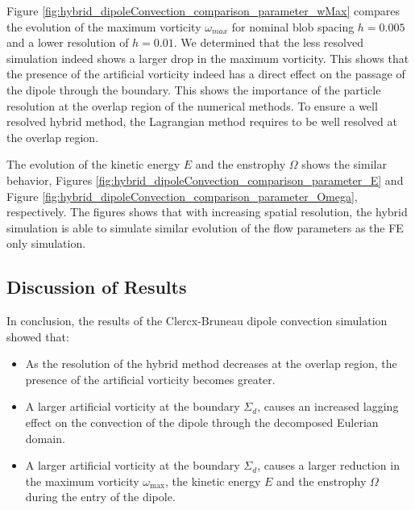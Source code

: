 
Figure \ref{fig:hybrid_dipoleConvection_comparison_parameter_wMax} compares the evolution of the maximum vorticity $\omega_{max}$ for nominal blob spacing $h=0.005$ and a lower resolution of $h=0.01$. We determined that the less resolved simulation indeed shows a larger drop in the maximum vorticity. This shows that the presence of the artificial vorticity indeed has a direct effect on the passage of the dipole through the boundary. This shows the importance of the particle resolution at the overlap region of the numerical methods. To ensure a well resolved hybrid method, the Lagrangian method requires to be well resolved at the overlap region.

The evolution of the kinetic energy $E$ and the enstrophy $\Omega$ shows the similar behavior, Figures \ref{fig:hybrid_dipoleConvection_comparison_parameter_E} and Figure \ref{fig:hybrid_dipoleConvection_comparison_parameter_Omega}, respectively. The figures shows that with increasing spatial resolution, the hybrid simulation is able to simulate similar evolution of the flow parameters as the FE only simulation.


\subsection{Discussion of Results}

In conclusion, the results of the Clercx-Bruneau dipole convection simulation showed that:
\begin{itemize}
\item As the resolution of the hybrid method decreases at the overlap region, the presence of the artificial vorticity becomes greater.
\item A larger artificial vorticity at the boundary $\Sigma_d$, causes an increased lagging effect on the convection of the dipole through the decomposed Eulerian domain.
\item A larger artificial vorticity at the boundary $\Sigma_d$, causes a larger reduction in the maximum vorticity $\omega_{\mathrm{max}}$, the kinetic energy $E$ and the enstrophy $\Omega$ during the entry of the dipole.
\end{itemize}

